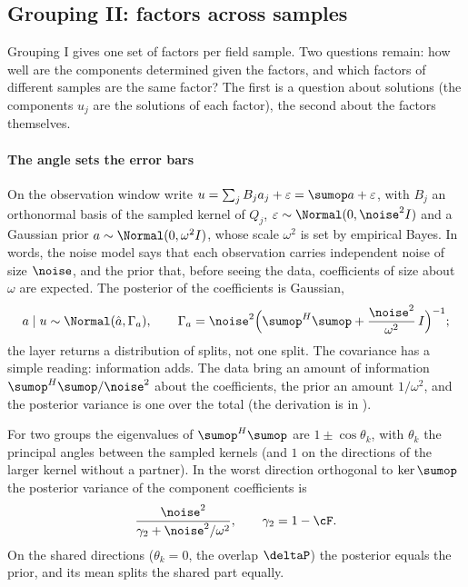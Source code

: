 \subsection{Grouping II: factors across samples}\label{sec:group2}
Grouping I gives one set of factors per field sample. Two questions remain: how well are the components determined given
the factors, and which factors of different samples are the same factor? The first is a question about solutions (the components $u_j$ are the solutions of each factor), the second about
the factors themselves.

\paragraph{The angle sets the error bars} On the observation window write $u=\sum_jB_ja_j+\varepsilon=\sumop a+\varepsilon$,
with $B_j$ an orthonormal basis of the sampled kernel of $Q_j$, $\varepsilon\sim\Normal(0,\noise^2I)$ and a Gaussian prior
$a\sim\Normal(0,\omega^2I)$, whose scale $\omega^2$ is set by empirical Bayes. In words, the noise model says that each observation carries independent noise of size $\noise$, and the prior that,
before seeing the data, coefficients of size about $\omega$ are expected. The posterior of the coefficients is Gaussian,
\begin{equation}\label{eq:posterior-a}
  a\mid u\sim\Normal(\hat a,\Gamma_a),\qquad
  \Gamma_a=\noise^2\Big(\sumop^H\sumop+\frac{\noise^2}{\omega^2}\,I\Big)^{-1};
\end{equation}
the layer returns a distribution of splits, not one split. The covariance has a simple reading: information adds. The data bring an amount of information
$\sumop^H\sumop/\noise^2$ about the coefficients, the prior an amount $1/\omega^2$, and the posterior variance is one over
the total (the derivation is in \SMvariances).

\begin{proposition}\label{prop:bayes-angle}
For two groups the eigenvalues of $\sumop^H\sumop$ are $1\pm\cos\theta_k$, with $\theta_k$ the principal angles between the
sampled kernels (and $1$ on the directions of the larger kernel without a partner). In the worst direction orthogonal to
$\ker\sumop$ the posterior variance of the component coefficients is
\begin{equation}\label{eq:bayes-angle}
  \frac{\noise^2}{\gamma_2+\noise^2/\omega^2},\qquad \gamma_2=1-\cF .
\end{equation}
On the shared directions ($\theta_k=0$, the overlap $\deltaP$) the posterior equals the prior, and its mean splits the
shared part equally.
\end{proposition}

